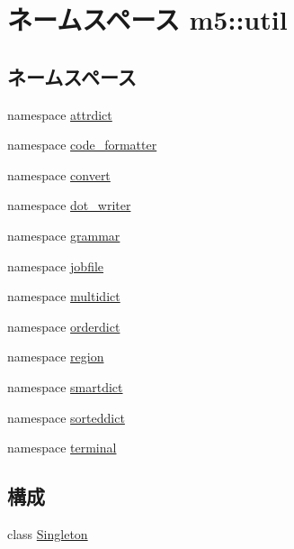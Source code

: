 \hypertarget{namespacem5_1_1util}{
\section{ネームスペース m5::util}
\label{namespacem5_1_1util}
}
\subsection*{ネームスペース}
\begin{DoxyCompactItemize}
\item 
namespace \hyperlink{namespacem5_1_1util_1_1attrdict}{attrdict}
\item 
namespace \hyperlink{namespacem5_1_1util_1_1code__formatter}{code\_\-formatter}
\item 
namespace \hyperlink{namespacem5_1_1util_1_1convert}{convert}
\item 
namespace \hyperlink{namespacem5_1_1util_1_1dot__writer}{dot\_\-writer}
\item 
namespace \hyperlink{namespacem5_1_1util_1_1grammar}{grammar}
\item 
namespace \hyperlink{namespacem5_1_1util_1_1jobfile}{jobfile}
\item 
namespace \hyperlink{namespacem5_1_1util_1_1multidict}{multidict}
\item 
namespace \hyperlink{namespacem5_1_1util_1_1orderdict}{orderdict}
\item 
namespace \hyperlink{namespacem5_1_1util_1_1region}{region}
\item 
namespace \hyperlink{namespacem5_1_1util_1_1smartdict}{smartdict}
\item 
namespace \hyperlink{namespacem5_1_1util_1_1sorteddict}{sorteddict}
\item 
namespace \hyperlink{namespacem5_1_1util_1_1terminal}{terminal}
\end{DoxyCompactItemize}
\subsection*{構成}
\begin{DoxyCompactItemize}
\item 
class \hyperlink{classm5_1_1util_1_1Singleton}{Singleton}
\end{DoxyCompactItemize}

